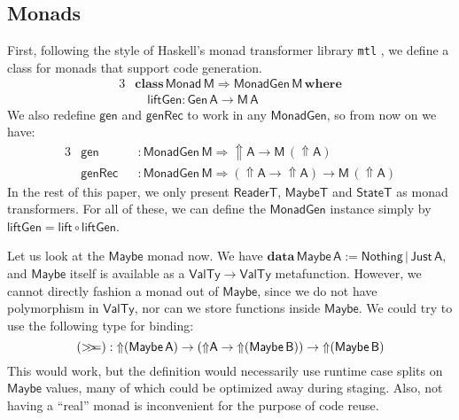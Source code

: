 \documentclass[acmsmall,screen]{acmart}
\newcommand{\mit}[1]{{\mathsf{#1}}}
\newcommand{\msf}[1]{{\mathsf{#1}}}
\newcommand{\mbf}[1]{{\mathbf{#1}}}
\newcommand{\ind}{\hspace{1em}}
\newcommand{\data}{\mbf{data}\,}
\newcommand{\where}{\mbf{where}}
\newcommand{\M}{\msf{M}}
\newcommand{\vA}{\mathsf{A}}
\newcommand{\vB}{\mathsf{B}}
\newcommand{\vM}{\mathsf{M}}
\newcommand{\ReaderT}{\msf{ReaderT}}
\newcommand{\Monad}{\msf{Monad}}
\newcommand{\Up}{{\Uparrow}}
\newcommand{\bind}{\mathbin{>\!\!>\mkern-6.7mu=}}
\newcommand{\VTy}{\msf{ValTy}}
\newcommand{\Maybe}{\msf{Maybe}}
\newcommand{\MaybeT}{\msf{MaybeT}}
\newcommand{\Nothing}{\msf{Nothing}}
\newcommand{\Just}{\msf{Just}}
\theoremstyle{remark}
\newcommand{\tyclass}{\mbf{class}}
\newcommand{\Gen}{\msf{Gen}}
\newcommand{\gen}{\mit{gen}}
\newcommand{\genRec}{\mit{genRec}}
\newcommand{\lift}{\mit{lift}}
\newcommand{\liftGen}{\mit{liftGen}}
\newcommand{\MonadGen}{\msf{MonadGen}}
\newcommand{\RA}{\Rightarrow}
\newcommand{\StateT}{\msf{StateT}}
\begin{document}
\subsection{Monads}\label{sec:monads}

First, following the style of Haskell's monad transformer library \texttt{mtl}
\cite{mtl}, we define a class for monads that support code generation.
\begin{alignat*}{3}
&\tyclass\,\Monad\,\vM \RA \MonadGen\,\vM\,\where\\
&\ind \liftGen : \Gen\,\vA \to \M\,\vA
\end{alignat*}
We also redefine $\gen$ and $\genRec$ to work in any $\MonadGen$, so from now on
we have:
\begin{alignat*}{3}
 &\gen   &&: \MonadGen\,\vM \RA \Up \vA \to \vM\,(\Up \vA)\\
 &\genRec &&: \MonadGen\,\vM \RA (\Up \vA \to \Up \vA) \to \vM\,(\Up \vA)
\end{alignat*}
In the rest of this paper, we only present $\ReaderT$, $\MaybeT$ and
$\StateT$ as monad transformers. For all of these, we can define the $\MonadGen$
instance simply by $\liftGen = \lift \circ \liftGen$.

Let us look at the $\Maybe$ monad now. We have $\data \Maybe\,\vA :=
\Nothing\,|\,\Just\,\vA$, and $\Maybe$ itself is available as a $\VTy \to \VTy$
metafunction. However, we cannot directly fashion a monad out of $\Maybe$, since
we do not have polymorphism in $\VTy$, nor can we store functions inside
$\Maybe$. We could try to use the following type for binding:
\[ (\bind) : \Up(\Maybe\,\vA) \to (\Up\vA \to \Up(\Maybe\,\vB)) \to \Up(\Maybe\,\vB) \]
This would work, but the definition would necessarily use runtime case splits on $\Maybe$
values, many of which could be optimized away during staging. Also, not having
a ``real'' monad is inconvenient for the purpose of code reuse.
\end{document}
